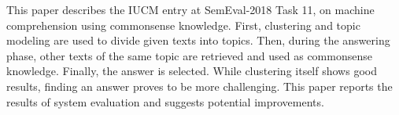 This paper describes the IUCM entry at SemEval-2018 Task 11, on machine comprehension using commonsense knowledge. First, clustering and topic modeling are used to divide given texts into topics. Then, during the answering phase, other texts of the same topic are retrieved and used as commonsense knowledge. Finally, the answer is selected. While clustering itself shows good results, finding an answer proves to be more challenging. This paper reports the results of system evaluation and suggests potential improvements.
